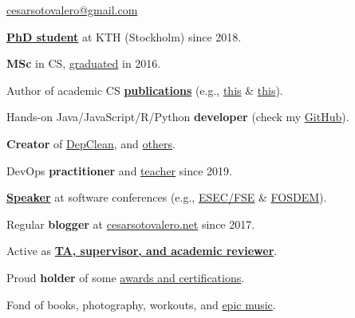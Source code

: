 \documentclass{cesar}
\begin{document}
\ybPrintPhoto{}

{\scshape\bfseries\Large {}}\newline
\href{mailto:cesarsotovalero@gmail.com}{cesarsotovalero@gmail.com}

\vspace{1em}

\textbf{\href{https://www.kth.se/profile/cesarsv}{PhD student}} at KTH (Stockholm) since 2018.

\textbf{MSc} in CS,
  \href{https://www.cesarsotovalero.net/files/certificates/MSc_Degree_(certified)_eng.pdf}{graduated} in 2016.
  
Author of academic CS \textbf{\href{https://www.cesarsotovalero.net/publications}{publications}}
  (e.g., \href{https://dx.doi.org/10.1007/s10664-020-09914-8}{this} \& \href{https://dx.doi.org/10.1109/MSR.2019.00059}{this}).


Hands-on Java/JavaScript/R/Python \textbf{developer}
  (check my \href{https://github.com/cesarsotovalero}{GitHub}).

\textbf{Creator} of \href{https://github.com/castor-software/depclean}{DepClean}, and
  \href{https://www.cesarsotovalero.net/software}{others}.
  
DevOps \textbf{practitioner} and \href{https://github.com/KTH/devops-course}{teacher} since 2019.
  
\textbf{\href{https://www.cesarsotovalero.net/talks}{Speaker}}
  at software conferences (e.g.,
  \href{https://youtu.be/cePEl485E_s}{ESEC/FSE} \&
  \href{https://youtu.be/8SndbPMwdWE}{FOSDEM}).
  
Regular \textbf{blogger} at \href{https://www.cesarsotovalero.net/}{cesarsotovalero.net} since 2017.

Active as \textbf{\href{https://www.cesarsotovalero.net/service}{TA, supervisor, and academic reviewer}}. 

Proud \textbf{holder} of some \href{https://www.cesarsotovalero.net/certifications.html}{awards and certifications}.


Fond of
  books,
  photography,
  workouts,
  and
  \href{https://open.spotify.com/playlist/1E4xBA3IYuTjtTphOV16FM}{epic music}.
\end{document}
